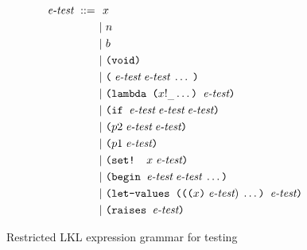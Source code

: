 \begin{figure}[!h]
    \centering
    \begin{align*}
      \textit{e\text{-}test}~::=~&~x \\
      &|~n \\
      &|~b \\
      &|~\texttt{(void)} \\
      &|~\texttt{(}\;\textit{e\text{-}test}\;\textit{e\text{-}test}\;\ldots\;\texttt{)} \\
      &|~\texttt{(lambda (}x!_{\_}\ldots\texttt{) }\textit{e\text{-}test}\texttt{)} \\
      &|~\texttt{(if }\textit{e\text{-}test}\;\textit{e\text{-}test}\;\textit{e\text{-}test}\texttt{)} \\
      &|~\texttt{(}p2\;\textit{e\text{-}test}\;\textit{e\text{-}test}\texttt{)} \\
      &|~\texttt{(}p1\;\textit{e\text{-}test}\texttt{)} \\
      &|~\texttt{(set! }x\;\textit{e\text{-}test}\texttt{)} \\
      &|~\texttt{(begin }\textit{e\text{-}test}\;\textit{e\text{-}test}\;\ldots\texttt{)} \\
      &|~\texttt{(let-values (((}x\texttt{)}\;\textit{e\text{-}test})\;\ldots\texttt{) }\textit{e\text{-}test}\texttt{)} \\
      &|~\texttt{(raises }\textit{e\text{-}test}\texttt{)}
    \end{align*}
    \caption{Restricted LKL expression grammar for testing}
    \label{fig:restricted-lkl-expression}
\end{figure}
